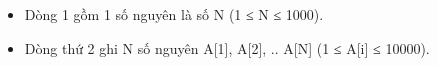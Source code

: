 \begin{itemize}
	\item     Dòng 1 gồm 1 số nguyên là số N (1 ≤ N ≤ 1000).   
	\item     Dòng thứ 2 ghi N số nguyên A[1], A[2], .. A[N] (1 ≤ A[i] ≤ 10000).   
\end{itemize}